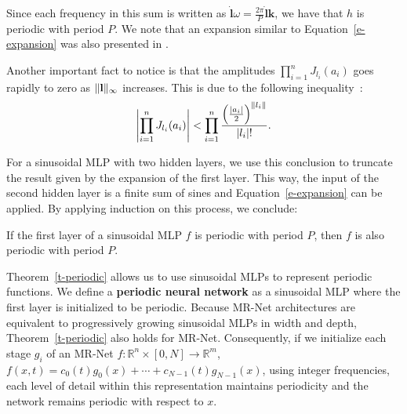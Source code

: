 Since each frequency in this sum is written as $\dot{\textbf{l}}{\omega}=\frac{2\pi}{P}\dot{\textbf{l}}{\textbf{k}}$, we have that $h$ is periodic with period $P$.
We note that an expansion similar to Equation~\ref{e-expansion} was also presented in \cite{yuce2022structured}.

Another important fact to notice is that the amplitudes $\prod_{i=1}^n J_{l_i}(a_i)$ goes rapidly to zero as $\lVert\textbf{l}\rVert_{\infty}$ increases. This is due to the following inequality~\cite{novello2022understanding}:
\begin{align}\label{e-upper-bound-freq}
    \left|\prod_{i=1}^n J_{l_i}(a_i)\right|<
    \prod_{i=1}^n\frac{\left(\frac{\left|a_i\right|}{2}\right)^{\lVert l_i\rVert}}{\left|l_i\right|!}.
\end{align}

For a sinusoidal MLP with two hidden layers, we use this conclusion to truncate the result given by the expansion of the first layer. This way, the input of the second hidden layer is a finite sum of sines and Equation~\ref{e-expansion} can be applied. By applying induction on this process, we conclude:

\begin{theorem}
\label{t-periodic}
    If the first layer of a sinusoidal MLP $f$ is periodic with period $P$, then $f$ is also periodic with period $P$.
\end{theorem}

Theorem~\ref{t-periodic} allows us to use sinusoidal MLPs to represent periodic functions. We define a \textbf{periodic neural network} as a sinusoidal MLP where the first layer is initialized to be periodic. Because MR-Net architectures are equivalent to progressively growing sinusoidal MLPs in width and depth, Theorem~\ref{t-periodic} also holds for MR-Net. Consequently, if we initialize each stage \( g_i \) of an MR-Net \( f: \mathbb{R}^n \times [0, N] \to \mathbb{R}^m \), \( f(x, t) = c_0(t) g_0(x) + \cdots + c_{N-1}(t) g_{N-1}(x) \), using integer frequencies, each level of detail within this representation maintains periodicity and the network remains periodic with respect to \( x \).


